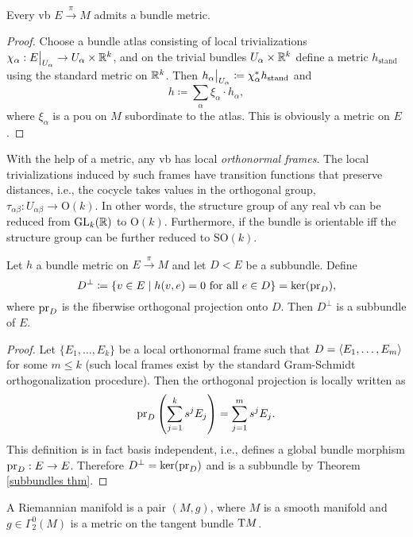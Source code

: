 \begin{thm}
Every \gls{vb} $E\overset\pi\to M$ admits a bundle metric. 
\end{thm}
\begin{proof}
Choose a bundle atlas consisting of local trivializations $\chi_\alpha:\restr{E}{U_\alpha}\to U_\alpha\times\bbR^k$, and on the trivial bundles $U_\alpha\times\mathbb{R}^k$ define a metric $h_{\text{stand}}$ using the standard metric on $\mathbb{R}^k$. Then $\restr{h_\alpha}{U_\alpha}\coloneqq \chi_\alpha^\ast h_{\text{stand}}$ and 
\[h\coloneqq \sum_\alpha \xi_\alpha \cdot h_\alpha,\]
where $\xi_\alpha$ is a \gls{pou} on $M$ subordinate to the atlas. This is obviously a metric on $E$.
\end{proof}
\begin{cor}
With the help of a metric, any \gls{vb} has local \emph{orthonormal frames}. The local trivializations induced by such frames have transition functions that preserve distances, i.e., the cocycle takes values in the orthogonal group, $\tau_{\alpha\beta}:U_{\alpha\beta}\to \mathrm{O}(k)$. In other words, the structure group of any real \gls{vb} can be reduced from $\operatorname{GL}_k(\mathbb{R} )$ to $\mathrm{O}(k)$. Furthermore, if the bundle is orientable iff the structure group can be further reduced to $\mathrm{SO}(k)$.
\end{cor}

\begin{prop}
Let $h$ a bundle metric on $E\overset\pi\to M$ and let $D< E$ be a subbundle. Define
\[D^\perp \coloneqq \{v\in E\mid h(v,e)=0 \text{ for all }e\in D\}=\ker (\operatorname{pr}_D),\]
where $\operatorname{pr}_D$ is the fiberwise orthogonal projection onto $D$. Then $D^\perp$ is a subbundle of $E$.
\end{prop}
\begin{proof}
Let $\{E_1,\ldots,E_k\}$ be a local orthonormal frame such that $D=\left\langle E_1,\ldots,E_m\right\rangle$ for some $m\leq k$ (such local frames exist by the standard Gram-Schmidt orthogonalization procedure). Then the orthogonal projection is locally written as
\[\operatorname{pr}_D \left(\sum_{j=1}^k s^j E_j\right)=\sum_{j=1}^m s^j E_j.\]
This definition is in fact basis independent, i.e., defines a global bundle morphism $\operatorname{pr}_D:E\to E$. Therefore $D^\perp =\ker (\operatorname{pr}_D)$ and is a subbundle by Theorem \ref{subbundles thm}.
\end{proof}


\begin{defn}
A Riemannian manifold is a pair $(M,g)$, where $M$ is a smooth manifold and $g\in\Gamma^0_2(M)$ is a metric on the tangent bundle $\mathrm{T} M$.
\end{defn}


